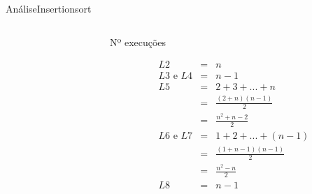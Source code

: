 \documentclass[aspectratio=169]{beamer}
\begin{document}
\begin{frame}[fragile]{Análise}{Insertionsort}
\begin{columns}[T] %
\begin{column}{.55\textwidth}

\end{column}%
\hfill%
\begin{column}{.45\textwidth}
Nº execuções
\begin{small}
\begin{eqnarray}
L2 &=& n \nonumber \\
L3 \textrm{ e } L4 &=& n - 1\nonumber \\
L5 &=& 2 + 3 + ... + n \nonumber \\
   &=& \frac{(2+n)(n-1)}{2}  \nonumber \\
   &=& \frac{n^2+n-2}{2} \nonumber \\
L6 \textrm{ e } L7 &=& 1 + 2 +...+(n-1) \nonumber \\
   &=& \frac{(1+n-1)(n-1)}{2} \nonumber \\
   &=& \frac{n^2 -n}{2} \nonumber \\
L8 &=& n-1 \nonumber        
\end{eqnarray}
\end{small}
\end{column}%
\end{columns}
\end{frame}

\end{document}

